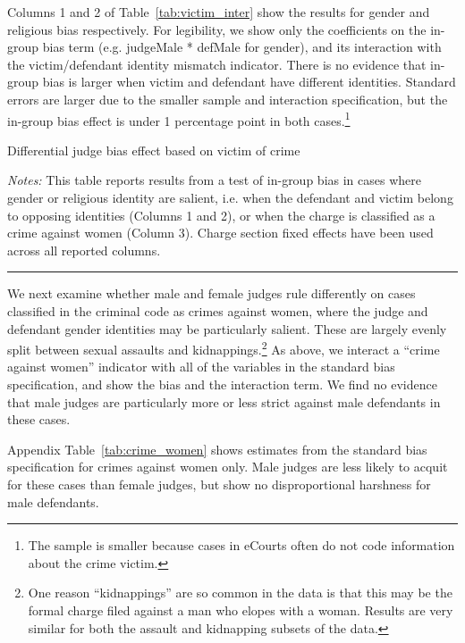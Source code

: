 \documentclass[12pt,english]{article}
\begin{document}
Columns 1 and 2 of Table~\ref{tab:victim_inter} show the results for gender and religious bias respectively. For legibility, we show only the coefficients on the in-group bias term (e.g. judgeMale * defMale for gender), and its interaction with the victim/defendant identity mismatch indicator. There is no evidence that in-group bias is larger when victim and defendant have different identities. Standard errors are larger due to the smaller sample and interaction specification, but the in-group bias effect is under 1 percentage point in both cases.\footnote{The sample is smaller because cases in eCourts often do not code information about the crime victim.}

  \begin{table}%
    \begin{center}
        \caption{Differential judge bias effect based on victim of crime}
      \label{tab:victim_inter}
        
  \begin{minipage}{\textwidth}
   \footnotesize \emph{Notes:} This table reports results from a test of in-group bias in cases where gender or religious identity are salient, i.e. when the defendant and victim belong to opposing identities (Columns 1 and 2), or when the charge is classified as a crime against women (Column 3). Charge section fixed effects have been used across all reported columns. \\ \hrule
   \end{minipage}
      \end{center}
    \end{table}

We next examine whether male and female judges rule differently on cases classified in the criminal code as crimes against women, where the judge and defendant gender identities may be particularly salient. These are largely evenly split between sexual assaults and kidnappings.\footnote{One reason ``kidnappings'' are so common in the data is that this may be the formal charge filed against a man who elopes with a woman. Results are very similar for both the assault and kidnapping subsets of the data.} As above, we interact a ``crime against women'' indicator with all of the variables in the standard bias specification, and show the bias and the interaction term. We find no evidence that male judges are particularly more or less strict against male defendants in these cases.

Appendix Table~\ref{tab:crime_women} shows estimates from the standard bias specification for crimes against women only. Male judges are less likely to acquit for these cases than female judges, but show no disproportional harshness for male defendants.
\end{document}

